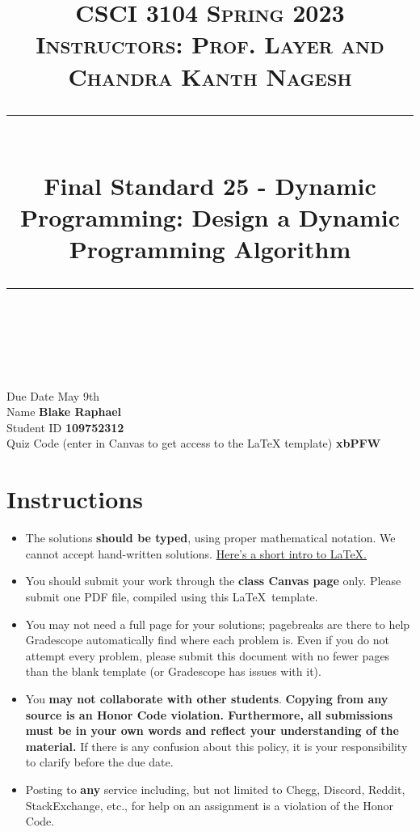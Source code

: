 \documentclass[11pt]{article}
\title{
\normalfont \normalsize 
\textsc{CSCI 3104 Spring 2023 \\
Instructors: Prof. Layer and Chandra Kanth Nagesh} \\
[10pt] 
\rule{\linewidth}{0.5pt} \\[6pt] 
\huge Final Standard 25 - Dynamic Programming: Design a Dynamic Programming Algorithm
\rule{\linewidth}{2pt}  \\[10pt]
}
\date{}
\theoremstyle{definition}
\theoremstyle{definition}
\theoremstyle{definition}
\begin{document}
\maketitle


\noindent
Due Date \dotfill May 9th \\
Name \dotfill \textbf{Blake Raphael} \\
Student ID \dotfill \textbf{109752312} \\
Quiz Code (enter in Canvas to get access to the LaTeX template) \dotfill \textbf{ xbPFW } \\

\tableofcontents

\section{Instructions}
 \begin{itemize}
	\item The solutions \textbf{should be typed}, using proper mathematical notation. We cannot accept hand-written solutions. \href{http://ece.uprm.edu/~caceros/latex/introduction.pdf}{Here's a short intro to \LaTeX.}
	\item You should submit your work through the \textbf{class Canvas page} only. Please submit one PDF file, compiled using this \LaTeX \ template.
	\item You may not need a full page for your solutions; pagebreaks are there to help Gradescope automatically find where each problem is. Even if you do not attempt every problem, please submit this document with no fewer pages than the blank template (or Gradescope has issues with it).

	\item You \textbf{may not collaborate with other students}. \textbf{Copying from any source is an Honor Code violation. Furthermore, all submissions must be in your own words and reflect your understanding of the material.} If there is any confusion about this policy, it is your responsibility to clarify before the due date. 

	\item Posting to \textbf{any} service including, but not limited to Chegg, Discord, Reddit, StackExchange, etc., for help on an assignment is a violation of the Honor Code.

	\end{itemize}
\newpage
\end{document}
